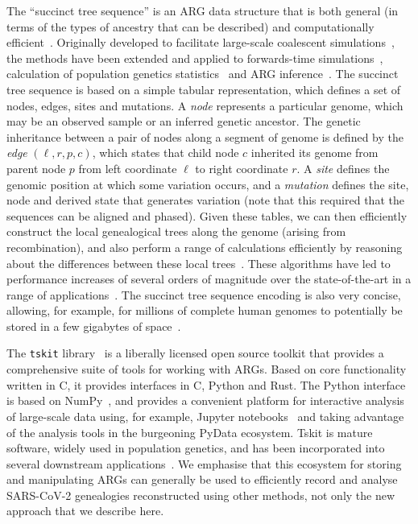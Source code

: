 \documentclass{article}
\begin{document}
The ``succinct tree sequence'' is an ARG data structure
that is both general (in terms of the types of ancestry that can
be described) and computationally efficient~\citep{Wong2023-efficient}.
Originally developed to facilitate large-scale coalescent
simulations~\citep{Kelleher2016-wk}, the methods have been
extended and applied to forwards-time
simulations~\citep{Kelleher2018-xc,Haller2018-tree},
calculation of population genetics statistics~\citep{Ralph2020-efficiently}
and ARG inference~\citep{Kelleher2019-ba,Wohns2022-th}.
The succinct tree sequence is based on a simple tabular representation,
which defines a set of nodes, edges, sites and mutations. A \emph{node}
represents a particular genome, which may be an observed sample
or an inferred genetic ancestor. The genetic inheritance between
a pair of nodes along a segment of genome is defined by
the \emph{edge} $(\ell, r, p, c)$, which states that
child node $c$ inherited its genome from parent node $p$
from left coordinate $\ell$ to right coordinate $r$. A \emph{site}
defines the genomic position at which some variation occurs,
and a \emph{mutation} defines the site, node and derived state
that generates variation (note that this required that the sequences can be aligned and phased).
Given these tables, we can then efficiently construct the local
genealogical trees along the genome (arising from recombination),
and also perform a range of calculations efficiently by
reasoning about the differences between these local
trees~\citep{Kelleher2016-wk,Ralph2020-efficiently}. These
algorithms have led to performance increases of several orders
of magnitude over the state-of-the-art in a range of
applications~\citep{Kelleher2016-wk,Kelleher2018-xc,Kelleher2019-ba,
Ralph2020-efficiently,Baumdicker2022-ep}.
The succinct tree sequence encoding
is also very concise, allowing, for example, for millions of
complete human genomes to potentially be stored in a few gigabytes of
space~\citep{Kelleher2019-ba}.

The \texttt{tskit} library~\citep{Tskit2023-tskit} is a liberally
licensed open source toolkit that provides a comprehensive suite
of tools for working with ARGs. Based on core functionality written
in C, it provides interfaces in C, Python and Rust. The Python interface
is based on NumPy~\citep{Harris2020-array}, and provides a convenient
platform for interactive analysis of large-scale data using, for
example, Jupyter notebooks~\citep{Kluyver2016-jupyter} and taking
advantage of the analysis tools in the burgeoning PyData ecosystem.
Tskit is mature software, widely used in population genetics, and
has been incorporated into several downstream
applications~\citep[e.g.][]{Haller2019-slim,Speidel2019-yh,
Terasaki2021-geonomics,
Fan2022-genealogical,Korfmann2022-weak,
Mahmoudi2022-bayesian,Petr2022-slendr,Rasmussen2022-espalier}. We emphasise that this ecosystem for storing and manipulating ARGs can generally be used to efficiently record and analyse SARS-CoV-2 genealogies reconstructed using other methods, not only the new approach that we describe here.
\end{document}

